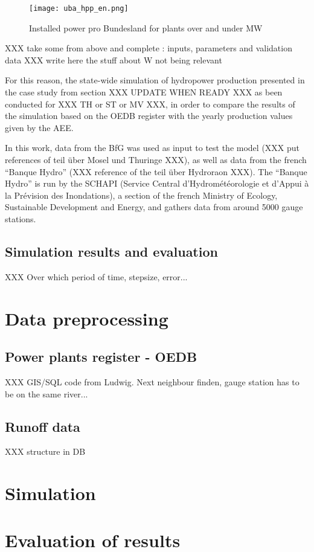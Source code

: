 \begin{figure}[H]
\centering
\texttt{[image: uba\_hpp\_en.png]}
\caption[Installed power pro Bundesland for plants over and under {\unit[1]{MW}}]{Installed power pro Bundesland for plants over and under {\unit[1]{MW}} \cite{uba_wasserkraft}}
\label{uba_hpp}
\end{figure}
XXX take some from above and complete : inputs, parameters and validation data
XXX write here the stuff about W not being relevant

For this reason, the state-wide simulation of hydropower production presented in the case study from section XXX UPDATE WHEN READY XXX as been conducted for XXX TH or ST or MV XXX, in order to compare the results of the simulation based on the OEDB register with the yearly production values given by the AEE.

In this work, data from the BfG was used as input to test the model (XXX put references of teil über Mosel und Thuringe XXX), as well as data from the french ``Banque Hydro'' (XXX reference of the teil über Hydroraon XXX). The ``Banque Hydro'' is run by the SCHAPI (Service Central d'Hydrométéorologie et d'Appui à la Prévision des Inondations), a section of the french Ministry of Ecology, Sustainable Development and Energy, and gathers data from around 5000 gauge stations.


\subsection{Simulation results and evaluation}
XXX Over which period of time, stepsize, error...

\section{Data preprocessing}

\subsection{Power plants register - OEDB}
XXX GIS/SQL code from Ludwig. Next neighbour finden, gauge station has to be on the same river...
\subsection{Runoff data}
XXX structure in DB

\section{Simulation}

\section{Evaluation of results}

